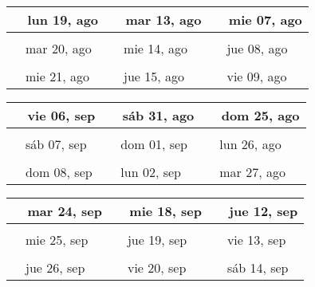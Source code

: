 \documentclass[letterpaper,10pt]{article}
\begin{document}
\begin{tabular}{lll}
\\
{\ \ lun 19, ago\hspace{4.5cm}\vspace{2.25cm}} &{\ \ mar 13, ago\hspace{4.5cm}} &{\ \ mie 07, ago\hspace{4.5cm}}
\\ \hline \\
{\ \ mar 20, ago\vspace{2.25cm}} & {\ \ mie 14, ago} & {\ \ jue 08, ago}
\\ \hline \\
{\ \ mie 21, ago\vspace{2.25cm}} & {\ \ jue 15, ago} & {\ \ vie 09, ago}
\\
\end{tabular}\par
\begin{tabular}{lll}
\\
{\ \ vie 06, sep\hspace{4.5cm}\vspace{2.25cm}} &{\ \ sáb 31, ago\hspace{4.5cm}} &{\ \ dom 25, ago\hspace{4.5cm}}
\\ \hline \\
{\ \ sáb 07, sep\vspace{2.25cm}} & {\ \ dom 01, sep} & {\ \ lun 26, ago}
\\ \hline \\
{\ \ dom 08, sep\vspace{2.25cm}} & {\ \ lun 02, sep} & {\ \ mar 27, ago}
\\
\end{tabular}\par
\begin{tabular}{lll}
\\
{\ \ mar 24, sep\hspace{4.5cm}\vspace{2.25cm}} &{\ \ mie 18, sep\hspace{4.5cm}} &{\ \ jue 12, sep\hspace{4.5cm}}
\\ \hline \\
{\ \ mie 25, sep\vspace{2.25cm}} & {\ \ jue 19, sep} & {\ \ vie 13, sep}
\\ \hline \\
{\ \ jue 26, sep\vspace{2.25cm}} & {\ \ vie 20, sep} & {\ \ sáb 14, sep}
\\
\end{tabular}\par
\end{document}
